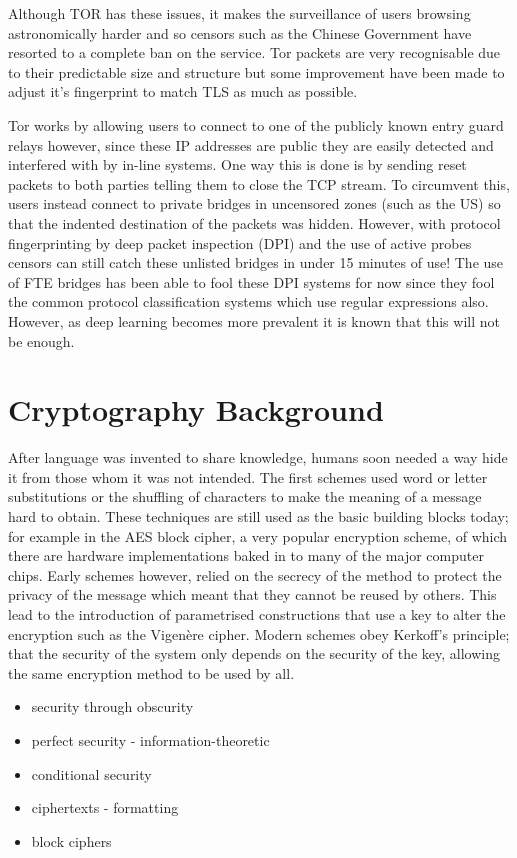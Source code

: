 \documentclass[10pt,a4paper]{article}
\begin{document}
Although TOR has these issues, it makes the surveillance of users browsing astronomically harder and so censors such as the Chinese Government have resorted to a complete ban on the service. Tor packets are very recognisable due to their predictable size and structure but some improvement have been made to adjust it's fingerprint to match TLS as much as possible. 

Tor works by allowing users to connect to one of the publicly known entry guard relays however, since these IP addresses are public they are easily detected and interfered with by in-line systems. One way this is done is by sending reset packets to both parties telling them to close the TCP stream.
To circumvent this, users instead connect to private bridges in uncensored zones (such as the US) so that the indented destination of the packets was hidden. However, with protocol fingerprinting by deep packet inspection (DPI) and the use of active probes censors can still catch these unlisted bridges in under 15 minutes of use!
The use of FTE bridges has been able to fool these DPI systems for now since they fool the common protocol classification systems which use regular expressions also. However, as deep learning becomes more prevalent it is known that this will not be enough.


\pagebreak
\section{Cryptography Background}
After language was invented to share knowledge, humans soon needed a way hide it from those whom it was not intended. The first schemes used word or letter substitutions or the shuffling of characters to make the meaning of a message hard to obtain. These techniques are still used as the basic building blocks today; for example in the AES block cipher, a very popular encryption scheme, of which there are hardware implementations baked in to many of the major computer chips. Early schemes however, relied on the secrecy of the method to protect the privacy of the message which meant that they cannot be reused by others. This lead to the introduction of parametrised constructions that use a key to alter the encryption such as the Vigen\`ere cipher. Modern schemes obey Kerkoff's principle; that the security of the system only depends on the security of the key, allowing the same encryption method to be used by all.
\begin{itemize}
 \item security through obscurity
 \item perfect security - information-theoretic
 \item conditional security
 \item ciphertexts - formatting
 \item block ciphers
\end{itemize}
\end{document}
